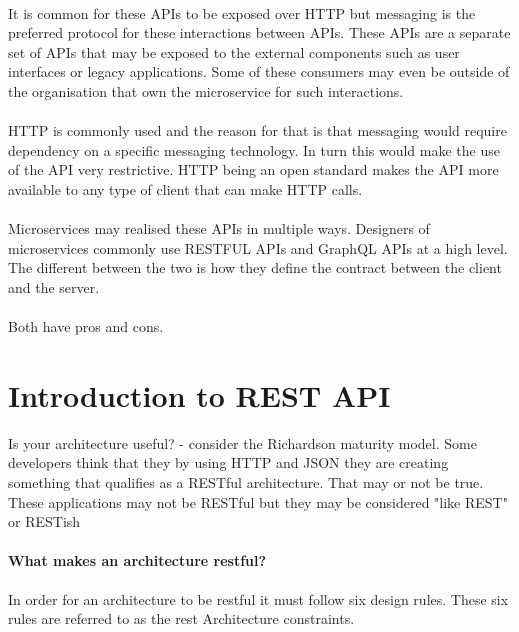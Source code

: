 \documentclass[a4paper, 11pt]{book}
\begin{document}
    \paragraph{}
    It is common for these APIs to be exposed over HTTP but messaging is the preferred protocol for these interactions between APIs.
    These APIs are a separate set of APIs that may be exposed to the external components such as user interfaces or legacy applications.
    Some of these consumers may even be outside of the organisation that own the microservice for such interactions.

    \paragraph{}
    HTTP is commonly used and the reason for that is that messaging would require dependency on a specific messaging technology.
    In turn this would make the use of the API very restrictive.
    HTTP being an open standard makes the API more available to any type of client that can make HTTP calls.

    \paragraph{}
    Microservices may realised these APIs in multiple ways.
    Designers of microservices commonly use RESTFUL APIs and GraphQL APIs at a high level.
    The different between the two is how they define the contract between the client and the server.

    \paragraph{}
    Both have pros and cons.


    \section{Introduction to REST API}

    Is your architecture useful? - consider the Richardson maturity model.
    Some developers think that they by using HTTP and JSON they are creating something that qualifies as a RESTful architecture.
    That may or not be true.
    These applications may not be RESTful but they may be considered "like REST" or RESTish

    \paragraph{What makes an architecture restful?}
    In order for an architecture to be restful it must follow six design rules.
    These six rules are referred to as the rest Architecture constraints.
\end{document}
